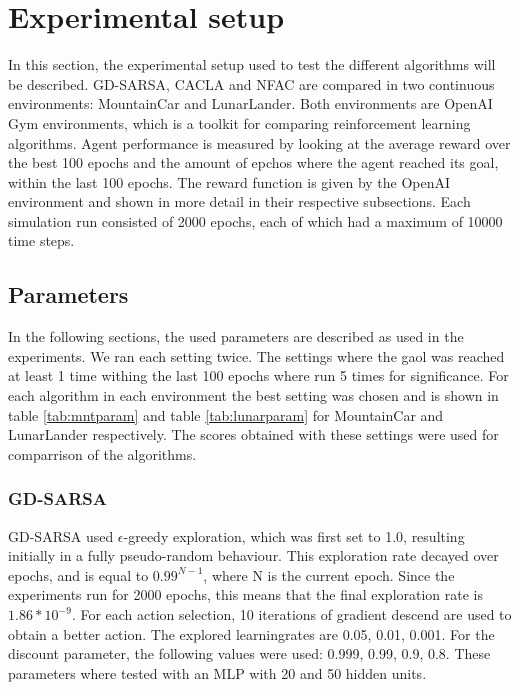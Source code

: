 
\section{Experimental setup}

In this section, the experimental setup used to test the different algorithms will be described. GD-SARSA, CACLA and NFAC are compared in two continuous environments: MountainCar\cite{openaimountaincar} and LunarLander\cite{openailunarlander}. Both environments are OpenAI Gym environments\cite{openaigym}, which is a toolkit for comparing reinforcement learning algorithms.  Agent performance is measured by looking at the average reward over the best 100 epochs and the amount of epchos where the agent reached its goal, within the last 100 epochs. The reward function is given by the OpenAI environment and shown in more detail in their respective subsections. Each simulation run consisted of 2000 epochs, each of which had a maximum of 10000 time steps.








\subsection{Parameters}
In the following sections, the used parameters are described as used in the experiments. We ran each setting twice. The settings where the gaol was reached at least 1 time withing the last 100 epochs where run 5 times for significance. For each algorithm in each environment the best setting was chosen and is shown in table \ref{tab:mntparam} and table \ref{tab:lunarparam} for MountainCar and LunarLander respectively. The scores obtained with these settings were used for comparrison of the algorithms. 
\subsubsection{GD-SARSA}
GD-SARSA used $\epsilon$-greedy exploration, which was first set to 1.0, resulting initially in a fully pseudo-random behaviour. This exploration rate decayed over epochs, and is equal to $0.99^{N-1}$, where N is the current epoch. Since the experiments run for 2000 epochs, this means that the final exploration rate is $1.86*10^{-9}$. For each action selection, 10 iterations of gradient descend are used to obtain a better action. The explored learningrates are 0.05, 0.01, 0.001. For the discount parameter, the following values were used: 0.999, 0.99, 0.9, 0.8. These parameters where tested with an MLP with 20 and 50 hidden units.
